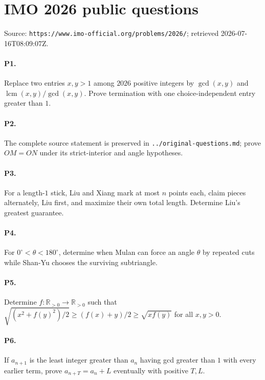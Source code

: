 \documentclass{article}
\begin{document}
\section*{IMO 2026 public questions}
Source: \texttt{https://www.imo-official.org/problems/2026/}; retrieved 2026-07-16T08:09:07Z.

\paragraph{P1.} Replace two entries $x,y>1$ among $2026$ positive integers by $\gcd(x,y)$ and $\operatorname{lcm}(x,y)/\gcd(x,y)$. Prove termination with one choice-independent entry greater than $1$.
\paragraph{P2.} The complete source statement is preserved in \texttt{../original-questions.md}; prove $OM=ON$ under its strict-interior and angle hypotheses.
\paragraph{P3.} For a length-$1$ stick, Liu and Xiang mark at most $n$ points each, claim pieces alternately, Liu first, and maximize their own total length. Determine Liu's greatest guarantee.
\paragraph{P4.} For $0^\circ<\theta<180^\circ$, determine when Mulan can force an angle $\theta$ by repeated cuts while Shan-Yu chooses the surviving subtriangle.
\paragraph{P5.} Determine $f:\mathbb R_{>0}\to\mathbb R_{>0}$ such that $\sqrt{(x^2+f(y)^2)/2}\ge(f(x)+y)/2\ge\sqrt{xf(y)}$ for all $x,y>0$.
\paragraph{P6.} If $a_{n+1}$ is the least integer greater than $a_n$ having gcd greater than $1$ with every earlier term, prove $a_{n+T}=a_n+L$ eventually with positive $T,L$.
\end{document}
